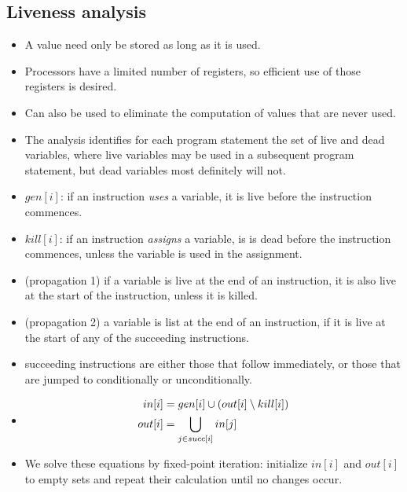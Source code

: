 \subsection{Liveness analysis}

\begin{itemize}

\item A value need only be stored as long as it is used.

\item Processors have a limited number of registers, so efficient use of those
registers is desired.

\item Can also be used to eliminate the computation of values that are never
used.

\item The analysis identifies for each program statement the set of live and
dead variables, where live variables may be used in a subsequent program
statement, but dead variables most definitely will not.

\item $gen[i]$: if an instruction \emph{uses} a variable, it is live
before the instruction commences.

\item $kill[i]$: if an instruction \emph{assigns} a variable, is is dead before
the instruction commences, unless the variable is used in the assignment.

\item (propagation 1) if a variable is live at the end of an instruction, it is also
live at the start of the instruction, unless it is killed.

\item (propagation 2) a variable is list at the end of an instruction, if it is
live at the start of any of the succeeding instructions.

\item succeeding instructions are either those that follow immediately, or
those that are jumped to conditionally or unconditionally.

\item

\begin{align}
in[i] &= gen[i] \cup \left({ out[i] \setminus kill[i] }\right)\\
out[i] &= \bigcup_{j\in succ[i]} in[j]
\end{align}

\item We solve these equations by fixed-point iteration: initialize $in[i]$ and
$out[i]$ to empty sets and repeat their calculation until no changes occur.


\end{itemize}
